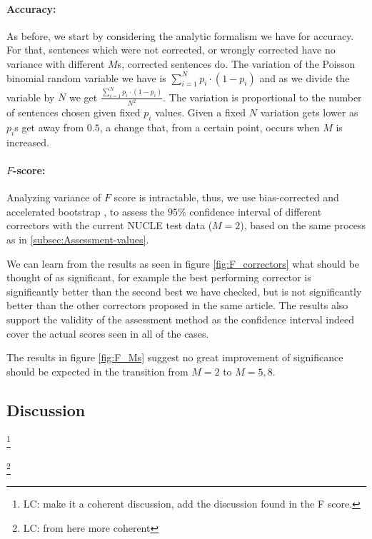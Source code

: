 \documentclass[letter,11pt]{article}
\newcommand{\lc}[1]{\footnote{\color{green}LC: #1}}
\begin{document}
		
		\paragraph{Accuracy:} As before, we start by considering the analytic formalism we have for accuracy. For that, sentences which were not corrected, or wrongly corrected have no variance with different $M$s, corrected sentences do. The variation of the Poisson binomial random variable we have is $\sum_{i=1}^{N}p_i\cdot\left(1-p_i\right)$ and as we divide the variable by $N$ we get $\frac{\sum_{i=1}^{N}p_i\cdot\left(1-p_i\right)}{N^2}$. 
		The variation is proportional to the number of sentences chosen given fixed $p_i$ values. Given a fixed $N$ variation gets lower as $p_i$s get away from $0.5$, a change that, from a certain point, occurs when $M$ is increased.
		
		\paragraph{$F$-score:} Analyzing variance of $F$ score is intractable\cite{yeh2000more}, thus, we use bias-corrected and accelerated bootstrap \cite{efron1987better}, to assess the $95\%$ confidence interval of different correctors with the current NUCLE test data ($M=2$), based on the same process as in \ref{subsec:Assessment-values}.
		
		We can learn from the results as seen in figure \ref{fig:F_correctors} what should be thought of as significant, for example the best performing corrector is significantly better than the second best we have checked, but is not significantly better than the other correctors proposed in the same article\cite{rozovskaya2016grammatical}. The results also  support the validity of the assessment method as the confidence interval indeed cover the actual scores seen in all of the cases. 
		
		The results in figure \ref{fig:F_Ms} suggest no great improvement of significance should be expected in the transition from $M=2$ to $M=5,8$.
		
		\subsection{Discussion}
		\lc{make it a coherent discussion, add the discussion found in the F score.}
		
		
		\lc{from here more coherent}
		
\end{document}
